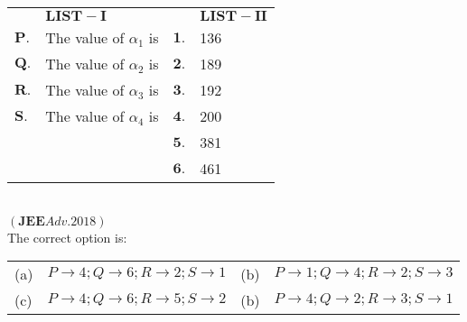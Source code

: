\documentclass[journal,12pt,twocolumn]{IEEEtran}
\theoremstyle{remark}
\begin{document}
\begin{tabular}{p{1cm}p{9cm}p{1cm}p{4cm}}
     &  $\mathbf{LIST-I}$ & & $\mathbf{LIST-II}$\\
    $\mathbf{P.}$  & The value of $\alpha_1$ is & $\mathbf{1.}$ & 136\\
    $\mathbf{Q.}$ & The value of $\alpha_2$ is & $\mathbf{2.}$&189\\
    $\mathbf{R.}$ & The value of $\alpha_3$ is & $\mathbf{3.}$&192\\
    $\mathbf{S.}$ & The value of $\alpha_4$ is & $\mathbf{4.}$&200\\
    & & $\mathbf{5.}$&381\\
    & & $\mathbf{6.}$&461\\
    
\end{tabular}\\

\hfill $(\mathbf{JEE} Adv. 2018)$\\
The correct option is:\\
\begin{tabular}{p{0.5cm}p{10cm}p{0.5cm}p{6cm}}
    (a) & $P \to4; Q\to6; R\to2; S\to 1$ & (b) & $P \to1; Q\to4; R\to2; S\to 3$ \\
     (c)& $P \to4; Q\to6; R\to5; S\to 2$ & (b) & $P \to4; Q\to2; R\to3; S\to 1$ 
\end{tabular}\\
\end{document}
